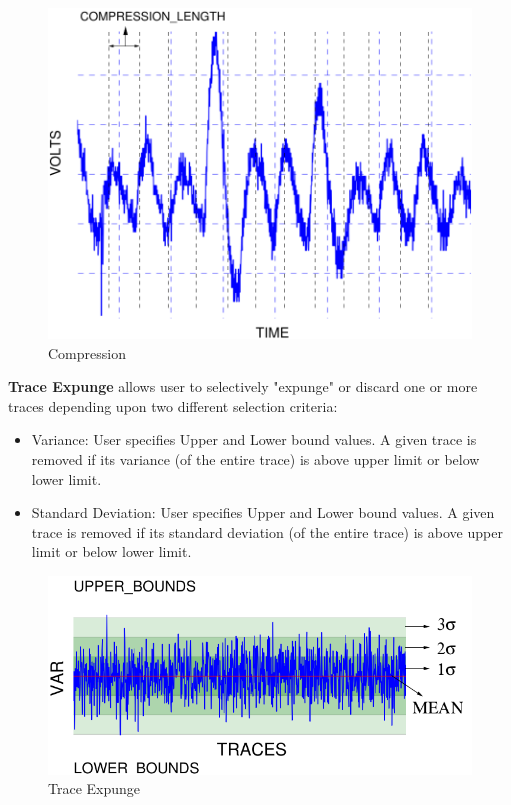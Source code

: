 \begin{figure}[ht]
\begin{center}
\includegraphics[scale=0.6]{figures/compression}
\caption{\label{fig:cmp}Compression}
\end{center} 
\vspace{-3ex}
\end{figure}

\textbf{Trace Expunge} allows user to selectively "expunge" or discard one or more traces 
depending upon two different selection criteria:

\begin{itemize}
\item Variance: User specifies Upper and Lower bound values. A given trace is removed if its variance (of the entire trace)
is above upper limit or below lower limit.
\item Standard Deviation: User specifies Upper and Lower bound values. A given trace is removed if its standard 
deviation (of the entire trace) is above upper limit or below lower limit.
\end{itemize}

\begin{figure}[ht]
\begin{center}
\includegraphics[scale=0.6]{figures/traceExpungMod}
\caption{\label{fig:tex}Trace Expunge}
\end{center} 
\vspace{-3ex}
\end{figure}

